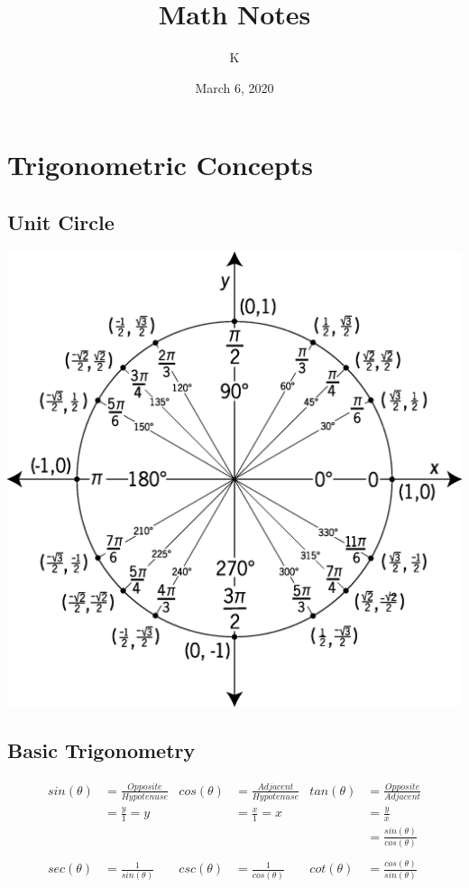 \documentclass[12pt, letterpaper]{article}
\title{Math Notes}
\author{K}
\date{March 6, 2020}
\begin{document}

\maketitle

\tableofcontents{}
\pagebreak

\section{Trigonometric Concepts}
\subsection{Unit Circle}
\graphicspath{{./assets}}
\includegraphics[width = \textwidth]{unit-circle7_43215}

\subsection{Basic Trigonometry}
\begin{align*}
  sin(\theta) &= \frac{Opposite}{Hypotenuse}&
    cos(\theta) &= \frac{Adjacent}{Hypotenuse}&
    tan(\theta) &= \frac{Opposite}{Adjacent}\\
  &= \frac{y}{1} = y&
    &= \frac{x}{1} = x&
    &= \frac{y}{x}\\
  &&
    &&
    &= \frac{sin(\theta)}{cos(\theta)}\\
    \\
  sec(\theta) &= \frac{1}{sin(\theta)}&
    csc(\theta) &= \frac{1}{cos(\theta)}&
    cot(\theta) &= \frac{cos(\theta)}{sin(\theta)}
\end{align*}
\end{document}
